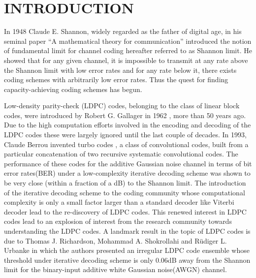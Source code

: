 %
%
%
%



\pagestyle{plain} %
\setcounter{page}{1}

\chapter{\uppercase {Introduction}}
In 1948 Claude E. Shannon, widely regarded as the father of digital age, in his seminal paper ``A mathematical theory for communication'' \cite{shannon2001mathematical} introduced the notion of fundamental limit for channel coding hereafter referred to as Shannon limit. He showed that for any given channel, it is impossible to transmit at any rate above the Shannon limit with low error rates and for any rate below it, there exists coding schemes with arbitrarily low error rates. Thus the quest for finding capacity-achieving coding schemes has begun. 

Low-density parity-check (LDPC) codes, belonging to the class of linear block codes, were introduced by Robert G. Gallager in 1962 \cite{gallager1962low}, more than 50 years ago. Due to the high computation efforts involved in the encoding and decoding of the LDPC codes these were largely ignored until the last couple of decades. In 1993, Claude Berrou \etal invented turbo codes \cite{berrou1993near}, a class of convolutional codes, built from a particular concatenation of two recursive systematic convolutional codes. The performance of these codes for the additive Gaussian noise channel in terms of bit error rates(BER) under a low-complexity iterative decoding scheme was shown to be very close (within a fraction of a dB) to the Shannon limit. The introduction of the iterative decoding scheme to the coding community whose computational complexity is only a small factor larger than a standard decoder like Viterbi decoder lead to the re-discovery of LDPC codes. This renewed interest in LDPC codes lead to an explosion of interest from the research community towards understanding the LDPC codes. A landmark result in the topic of LDPC codes is due to Thomas J. Richardson, Mohammad A. Shokrollahi and R{\"u}diger L. Urbanke \cite{richardson2001design} in which the authors presented an irregular LDPC code ensemble whose threshold under iterative decoding scheme is only 0.06dB away from the Shannon limit for the binary-input additive white Gaussian noise(AWGN) channel. 

